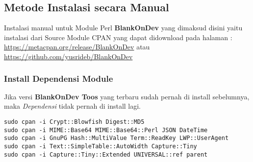 \subsection{Metode Instalasi secara Manual}
\noindent
Instalasi manual untuk Module Perl \textbf{BlankOnDev} yang dimaksud disini yaitu instalasi dari Source Module CPAN yang dapat didownload pada halaman : \\ \footnotesize{\url{https://metacpan.org/release/BlankOnDev}} atau \\
\footnotesize{\url{https://github.com/yusrideb/BlankOnDev}}

\subsubsection{Install Dependensi Module}
\noindent
\normalsize
Jika versi \textbf{BlankOnDev Toos} yang terbaru sudah pernah di install sebelumnya, maka \textit{Dependensi} tidak pernah di install lagi.

\begin{lstlisting}[language=ShellBash]
sudo cpan -i Crypt::Blowfish Digest::MD5 
sudo cpan -i MIME::Base64 MIME::Base64::Perl JSON DateTime
sudo cpan -i GnuPG Hash::MultiValue Term::ReadKey LWP::UserAgent  
sudo cpan -i Text::SimpleTable::AutoWidth Capture::Tiny 
sudo cpan -i Capture::Tiny::Extended UNIVERSAL::ref parent
\end{lstlisting}


